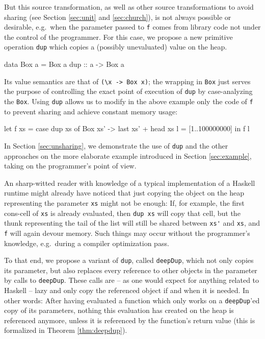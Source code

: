 \documentclass[preprint]{sigplanconf}
\theoremstyle{nonumberplain}
\newcommand{\li}{\lstinline[style=Haskell]}
\begin{document}
But this source transformation, as well as other source transformations to avoid sharing (see Section \ref{sec:unit} and \ref{sec:church}), is not always possible or desirable, e.g.\  when the parameter passed to \li-f- comes from library code not under the control of the programmer. For this case, we propose a new primitive operation \li-dup- which copies a (possibly unevaluated) value on the heap.
\pagebreak[3]
\begin{haskell}
data Box a = Box a
dup :: a -> Box a
\end{haskell}
Its value semantics are that of \li!(\x -> Box x)!; the wrapping in \li-Box- just serves the purpose of controlling the exact point of execution of \li-dup- by case-analyzing the \li-Box-. Using \li-dup- allows us to modify in the above example only the code of \li-f- to prevent sharing and achieve constant memory usage:
\begin{haskell}
let f xs = case dup xs of
    	Box xs' -> last xs' + head xs
    l = [1..100000000]
in  f l
\end{haskell}
In Section \ref{sec:unsharing}, we demonstrate the use of \li-dup- and the other approaches on the more elaborate example introduced in Section \ref{sec:example}, taking on the programmer’s point of view.

An sharp-witted reader with knowledge of a typical implementation of a Haskell runtime might already have noticed that just copying the object on the heap representing the parameter \li-xs- might not be enough: If, for example, the first cons-cell of \li-xs- is already evaluated, then \li-dup xs- will copy that cell, but the thunk representing the tail of the list will still be shared between \li-xs'- and \li-xs-, and \li-f- will again devour memory. Such things may occur without the programmer’s knowledge, e.g.\ during a compiler optimization pass.

To that end, we propose a variant of \li-dup-, called \li-deepDup-, which not only copies its parameter, but also replaces every reference to other objects in the parameter by calls to \li-deepDup-. These calls are -- as one would expect for anything related to Haskell -- lazy and only copy the referenced object if and when it is needed. In other words: After having evaluated a function which only works on a \li-deepDup-’ed copy of its parameters, nothing this evaluation has created on the heap is referenced anymore, unless it is referenced by the function's return value (this is formalized in Theorem \ref{thm:deepdup}).
\end{document}
